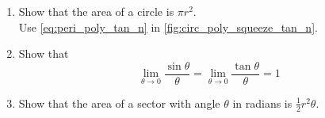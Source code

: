 \begin{enumerate}[label=\arabic*.,ref=\thesubsection.\theenumi]
\item Show that the area of a circle is $\pi r^2$.
\\
\solution Use \eqref{eq:peri_poly_tan_n} in \eqref{fig:circ_poly_squeeze_tan_n}.


%
\item
	Show that
	\begin{equation}
	\lim_{\theta \rightarrow 0} \frac{\sin\theta}{\theta} =
	\lim_{\theta \rightarrow 0} \frac{\tan\theta}{\theta} = 1
	\end{equation}

\item
	Show that the area of a sector with angle $\theta$ in radians is $\frac{1}{2}r^2\theta$.


\end{enumerate}
